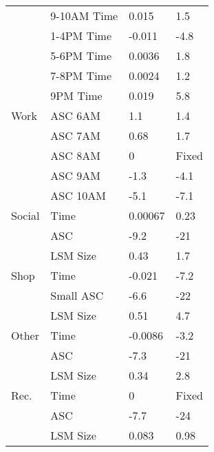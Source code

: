 \begin{table}
\begin{tabular}{llll}
                &              9-10AM Time &      0.015 &        1.5 \\   
                &		        1-4PM Time &     -0.011 &       -4.8 \\ 
                &                 5-6PM Time &     0.0036 &        1.8 \\ 
                &                 7-8PM Time &     0.0024 &        1.2 \\ 
                &                 9PM Time &      0.019 &        5.8 \\ 
\noalign{\smallskip}
           Work &                  ASC 6AM &        1.1 &        1.4 \\ 
                &                  ASC 7AM &       0.68 &        1.7 \\ 
				&				   ASC 8AM &         0  &     Fixed\\
                &                  ASC 9AM &       -1.3 &       -4.1 \\ 
                &                 ASC 10AM &       -5.1 &       -7.1 \\ 
\noalign{\smallskip}
         Social &                     Time &    0.00067 &       0.23 \\ 
                &                      ASC &       -9.2 &        -21 \\ 
                &                 LSM Size &       0.43 &        1.7 \\ 
\noalign{\smallskip}
           Shop &                     Time &     -0.021 &       -7.2 \\ 
                &                Small ASC &       -6.6 &        -22 \\ 
                &                 LSM Size &       0.51 &        4.7 \\ 
\noalign{\smallskip}
          Other &                     Time &    -0.0086 &       -3.2 \\ 
                &                      ASC &       -7.3 &        -21 \\ 
                &                 LSM Size &       0.34 &        2.8 \\ 
\noalign{\smallskip}
           Rec. &             		  Time &          0 &       Fixed\\          
		        &                      ASC &       -7.7 &        -24 \\ 
                &                 LSM Size &      0.083 &       0.98 

\end{tabular}
\end{table}

